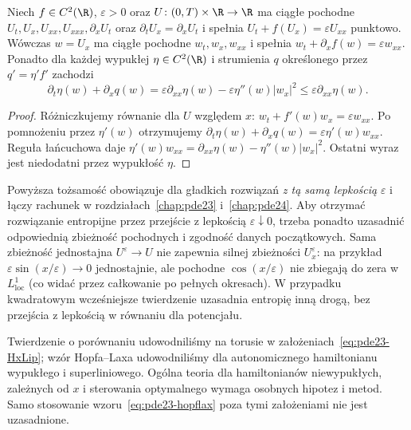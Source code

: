 \begin{stwierdzenie}
\label{prop:pde-v43-hj-viscous}
Niech $f\in C^2(\R)$, $\varepsilon>0$ oraz
$U\colon(0,T)\times\R\to\R$ ma ciągłe pochodne
$U_t,U_x,U_{xx},U_{xxx},\partial_x U_t$ oraz
$\partial_t U_x=\partial_x U_t$ i spełnia
$U_t+f(U_x)=\varepsilon U_{xx}$ punktowo.
Wówczas $w=U_x$ ma ciągłe pochodne
$w_t,w_x,w_{xx}$ i spełnia
$w_t+\partial_x f(w)=\varepsilon w_{xx}$.
Ponadto dla każdej wypukłej $\eta\in C^2(\R)$ i
strumienia $q$ określonego przez $q'=\eta' f'$ zachodzi
\[
 \partial_t\eta(w)+\partial_x q(w)
 =\varepsilon\partial_{xx}\eta(w)
 -\varepsilon\eta''(w)|w_x|^2
 \le\varepsilon\partial_{xx}\eta(w).
\]
\end{stwierdzenie}
\begin{proof}
Różniczkujemy równanie dla $U$ względem $x$:
$w_t+f'(w)w_x=\varepsilon w_{xx}$.
Po pomnożeniu przez $\eta'(w)$ otrzymujemy
$\partial_t\eta(w)+\partial_xq(w)
=\varepsilon\eta'(w)w_{xx}$.
Reguła łańcuchowa daje
$\eta'(w)w_{xx}=\partial_{xx}\eta(w)-\eta''(w)|w_x|^2$.
Ostatni wyraz jest niedodatni przez wypukłość $\eta$.
\end{proof}

\begin{uwaga}
Powyższa tożsamość obowiązuje dla gładkich rozwiązań
\emph{z tą samą lepkością} $\varepsilon$ i łączy
rachunek w rozdziałach~\ref{chap:pde23} i~\ref{chap:pde24}.
Aby otrzymać rozwiązanie entropijne przez przejście
z lepkością $\varepsilon\downarrow0$, trzeba
ponadto uzasadnić odpowiednią zbieżność pochodnych
i zgodność danych początkowych.
Sama zbieżność jednostajna $U^\varepsilon\to U$
nie zapewnia silnej zbieżności $U_x^\varepsilon$:
na przykład $\varepsilon\sin(x/\varepsilon)\to0$
jednostajnie, ale pochodne $\cos(x/\varepsilon)$
nie zbiegają do zera w $L^1_{\mathrm{loc}}$
(co widać przez całkowanie po pełnych okresach).
W przypadku kwadratowym wcześniejsze twierdzenie
uzasadnia entropię inną drogą, bez przejścia
z lepkością w równaniu dla potencjału.
\end{uwaga}


\begin{uwaga}
Twierdzenie o porównaniu udowodniliśmy na torusie
w założeniach~\eqref{eq:pde23-HxLip}; wzór Hopfa--Laxa
udowodniliśmy dla autonomicznego hamiltonianu wypukłego
i superliniowego. Ogólna teoria dla hamiltonianów
niewypukłych, zależnych od $x$ i sterowania optymalnego
wymaga osobnych hipotez i metod. Samo stosowanie
wzoru~\eqref{eq:pde23-hopflax} poza tymi założeniami
nie jest uzasadnione.
\end{uwaga}

